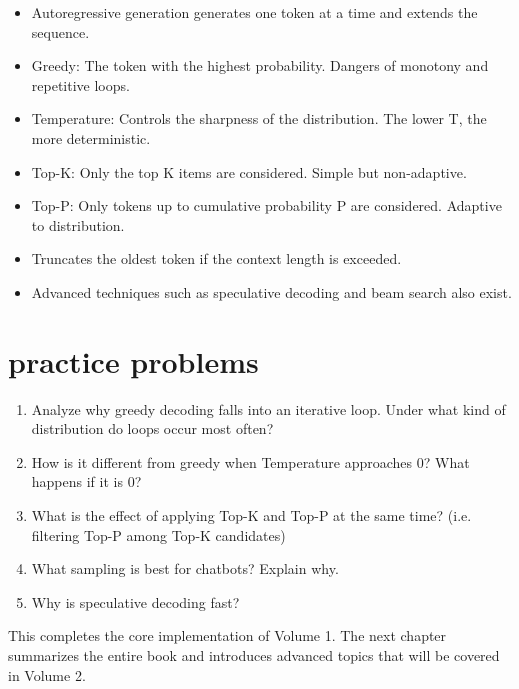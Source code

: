 \begin{itemize}
\item Autoregressive generation generates one token at a time and extends the sequence.
\item Greedy: The token with the highest probability. Dangers of monotony and repetitive loops.
\item Temperature: Controls the sharpness of the distribution. The lower T, the more deterministic.
\item Top-K: Only the top K items are considered. Simple but non-adaptive.
\item Top-P: Only tokens up to cumulative probability P are considered. Adaptive to distribution.
\item Truncates the oldest token if the context length is exceeded.
\item Advanced techniques such as speculative decoding and beam search also exist.
\end{itemize}

\section{practice problems}

\begin{enumerate}
\item Analyze why greedy decoding falls into an iterative loop. Under what kind of distribution do loops occur most often?
\item How is it different from greedy when Temperature approaches 0? What happens if it is 0?
\item What is the effect of applying Top-K and Top-P at the same time? (i.e. filtering Top-P among Top-K candidates)
\item What sampling is best for chatbots? Explain why.
\item Why is speculative decoding fast?
\end{enumerate}

This completes the core implementation of Volume 1. The next chapter summarizes the entire book and introduces advanced topics that will be covered in Volume 2.
